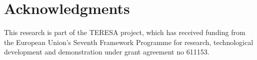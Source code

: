 \documentclass[conference]{IEEEtran}
\begin{document}
%
%
%
%
%


\section*{Acknowledgments}

This research is part of the TERESA project, which has received funding from the 
European Union's Seventh Framework Programme for research, technological 
development and demonstration under grant agreement no 611153.




\end{document}

